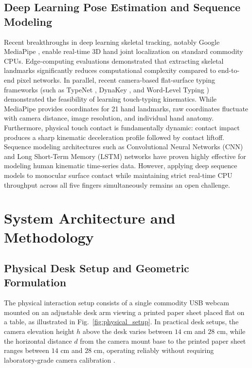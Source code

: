 \documentclass[conference]{IEEEtran}
\begin{document}
\subsection{Deep Learning Pose Estimation and Sequence Modeling}
Recent breakthroughs in deep learning skeletal tracking, notably Google MediaPipe \cite{Zhang2020MediaPipe}, enable real-time 3D hand joint localization on standard commodity CPUs. Edge-computing evaluations \cite{Andriyanov2025Improving, SanchezBrizuela2023Lightweight, Ivacko2024Edge} demonstrated that extracting skeletal landmarks significantly reduces computational complexity compared to end-to-end pixel networks. In parallel, recent camera-based flat-surface typing frameworks (such as TypeNet \cite{Maman2023TypeNet}, DynaKey \cite{Zhang2022DynaKey}, and Word-Level Typing \cite{Yoo2026WordLevel}) demonstrated the feasibility of learning touch-typing kinematics. While MediaPipe provides coordinates for 21 hand landmarks, raw coordinates fluctuate with camera distance, image resolution, and individual hand anatomy. Furthermore, physical touch contact is fundamentally dynamic: contact impact produces a sharp kinematic deceleration profile followed by contact liftoff. Sequence modeling architectures such as Convolutional Neural Networks (CNN) \cite{Lai2018CNN, Li2021CNN, Nunez2018Convolutional} and Long Short-Term Memory (LSTM) networks \cite{Hochreiter1997LSTM, Doan2022Efficient, GilMartin2023Hand, Gammulle2021TMMF} have proven highly effective for modeling human kinematic time-series data. However, applying deep sequence models to monocular surface contact while maintaining strict real-time CPU throughput across all five fingers simultaneously remains an open challenge.

\section{System Architecture and Methodology}
\label{sec:methodology}

\subsection{Physical Desk Setup and Geometric Formulation}
The physical interaction setup consists of a single commodity USB webcam mounted on an adjustable desk arm viewing a printed paper sheet placed flat on a table, as illustrated in Fig.~\ref{fig:physical_setup}. In practical desk setups, the camera elevation height $h$ above the desk varies between $14\text{ cm}$ and $28\text{ cm}$, while the horizontal distance $d$ from the camera mount base to the printed paper sheet ranges between $14\text{ cm}$ and $28\text{ cm}$, operating reliably without requiring laboratory-grade camera calibration \cite{Herdiansyah2024Implementation}.
\end{document}
